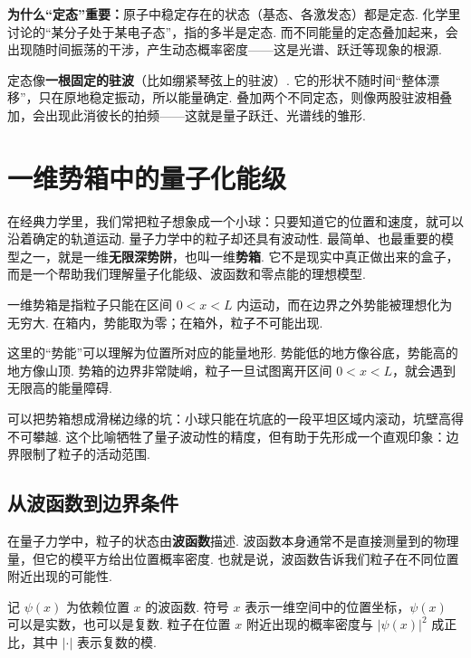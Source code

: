 \documentclass[UTF8,11pt,a4paper,openany]{ctexbook}
\newcommand{\term}[1]{\textbf{#1}}
\begin{document}
\textbf{为什么“定态”重要：}原子中稳定存在的状态（基态、各激发态）都是定态. 化学里讨论的“某分子处于某电子态”，指的多半是定态. 而不同能量的定态叠加起来，会出现随时间振荡的干涉，产生动态概率密度——这是光谱、跃迁等现象的根源. 

\begin{analogybox}
定态像\textbf{一根固定的驻波}（比如绷紧琴弦上的驻波）. 它的形状不随时间“整体漂移”，只在原地稳定振动，所以能量确定. 叠加两个不同定态，则像两股驻波相叠加，会出现此消彼长的拍频——这就是量子跃迁、光谱线的雏形. 
\end{analogybox}

\chapter{一维势箱中的量子化能级}

在经典力学里，我们常把粒子想象成一个小球：只要知道它的位置和速度，就可以沿着确定的轨道运动. 量子力学中的粒子却还具有波动性. 最简单、也最重要的模型之一，就是一维\term{无限深势阱}，也叫一维\term{势箱}. 它不是现实中真正做出来的盒子，而是一个帮助我们理解量子化能级、波函数和零点能的理想模型. 

\begin{definitionbox}
一维势箱是指粒子只能在区间 $0<x<L$ 内运动，而在边界之外势能被理想化为无穷大. 在箱内，势能取为零；在箱外，粒子不可能出现. 
\end{definitionbox}

这里的“势能”可以理解为位置所对应的能量地形. 势能低的地方像谷底，势能高的地方像山顶. 势箱的边界非常陡峭，粒子一旦试图离开区间 $0<x<L$，就会遇到无限高的能量障碍. 

\begin{analogybox}
可以把势箱想成滑梯边缘的坑：小球只能在坑底的一段平坦区域内滚动，坑壁高得不可攀越. 这个比喻牺牲了量子波动性的精度，但有助于先形成一个直观印象：边界限制了粒子的活动范围. 
\end{analogybox}

\section{从波函数到边界条件}

在量子力学中，粒子的状态由\term{波函数}描述. 波函数本身通常不是直接测量到的物理量，但它的模平方给出位置概率密度. 也就是说，波函数告诉我们粒子在不同位置附近出现的可能性. 

\begin{notationbox}
记 $\psi(x)$ 为依赖位置 $x$ 的波函数. 符号 $x$ 表示一维空间中的位置坐标，$\psi(x)$ 可以是实数，也可以是复数. 粒子在位置 $x$ 附近出现的概率密度与 $|\psi(x)|^2$ 成正比，其中 $|\cdot|$ 表示复数的模. 
\end{notationbox}
\end{document}
